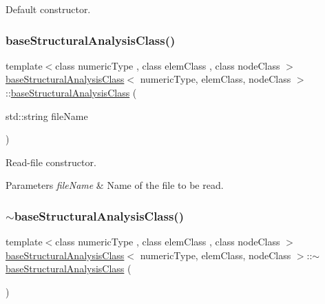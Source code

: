 Default constructor. \mbox{\label{classbase_structural_analysis_class_ac51091bf5f718cdc746c20d9cd5a0cab}} 
\subsubsection{\texorpdfstring{base\+Structural\+Analysis\+Class()}{baseStructuralAnalysisClass()}\hspace{0.1cm}{\footnotesize\ttfamily [2/2]}}
{\footnotesize\ttfamily template$<$class numeric\+Type , class elem\+Class , class node\+Class $>$ \\
\mbox{\hyperlink{classbase_structural_analysis_class}{base\+Structural\+Analysis\+Class}}$<$ numeric\+Type, elem\+Class, node\+Class $>$\+::\mbox{\hyperlink{classbase_structural_analysis_class}{base\+Structural\+Analysis\+Class}} (\begin{DoxyParamCaption}\item[{std\+::string}]{file\+Name }\end{DoxyParamCaption})\hspace{0.3cm}{\ttfamily [explicit]}}

Read-\/file constructor. 
\begin{DoxyParams}{Parameters}
{\em file\+Name} & Name of the file to be read. \\
\hline
\end{DoxyParams}
\mbox{\label{classbase_structural_analysis_class_a70a5a3407cdeb6f32f69fb1fd7ba6e75}} 
\subsubsection{\texorpdfstring{$\sim$base\+Structural\+Analysis\+Class()}{~baseStructuralAnalysisClass()}}
{\footnotesize\ttfamily template$<$class numeric\+Type , class elem\+Class , class node\+Class $>$ \\
\mbox{\hyperlink{classbase_structural_analysis_class}{base\+Structural\+Analysis\+Class}}$<$ numeric\+Type, elem\+Class, node\+Class $>$\+::$\sim$\mbox{\hyperlink{classbase_structural_analysis_class}{base\+Structural\+Analysis\+Class}} (\begin{DoxyParamCaption}{ }\end{DoxyParamCaption})\hspace{0.3cm}{\ttfamily [inline]}}

